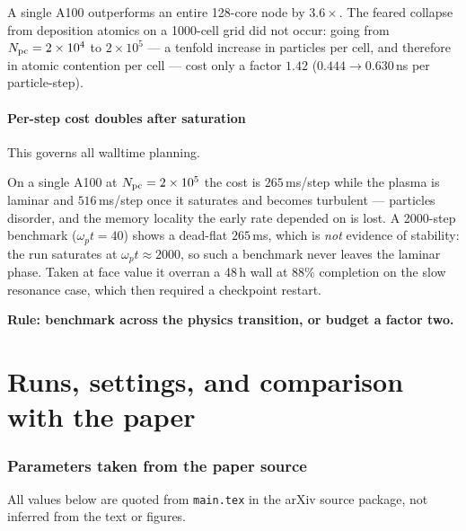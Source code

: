 \documentclass[11pt,a4paper]{article}
\newcommand{\code}[1]{\texttt{\small #1}}
\newcommand{\wpt}{\omega_p t}
\newcommand{\Npc}{N_{\rm pc}}
\begin{document}
A single A100 outperforms an entire 128-core node by $3.6\times$. The feared collapse
from deposition atomics on a 1000-cell grid did not occur: going from
$\Npc = 2\times10^4$ to $2\times10^5$ --- a tenfold increase in particles per cell, and
therefore in atomic contention per cell --- cost only a factor $1.42$
($0.444 \rightarrow 0.630$\,ns per particle-step).

\subsection{Per-step cost doubles after saturation}
\label{sec:slowdown}

This governs all walltime planning.

On a single A100 at $\Npc = 2\times10^5$ the cost is $265$\,ms/step while the plasma is
laminar and $516$\,ms/step once it saturates and becomes turbulent --- particles
disorder, and the memory locality the early rate depended on is lost. A 2000-step
benchmark ($\wpt = 40$) shows a dead-flat $265$\,ms, which is \emph{not} evidence of
stability: the run saturates at $\wpt \approx 2000$, so such a benchmark never leaves
the laminar phase. Taken at face value it overran a 48\,h wall at 88\% completion on
the slow resonance case, which then required a checkpoint restart.

\textbf{Rule: benchmark across the physics transition, or budget a factor two.}

\clearpage
\part{Runs, settings, and comparison with the paper}
\label{part:runs}

\section{Parameters taken from the paper source}
\label{sec:paperparams}

All values below are quoted from \code{main.tex} in the arXiv source package, not
inferred from the text or figures.
\end{document}
